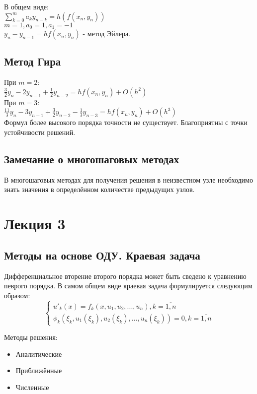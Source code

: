 В общем виде:\\
$\sum\limits_{k=0}^{m} a_{k} y_{n - k} = h(f(x_{n}, y_{n}))$\\
$m = 1, a_{0} = 1, a_{1} = -1$\\
$y_{n} - y_{n - 1} = h f (x_{n}, y_{n})$ - метод Эйлера.\\

\section{Метод Гира}
При $m = 2$:\\
$\frac{3}{2} y_{n} - 2 y_{n-1} + \frac{1}{2}y_{n-2} = h f (x_{n}, y_{n}) + O(h^{2})$\\
При $m = 3$:\\
$\frac{11}{3}y_{n} - 3y_{n-1} + \frac{3}{2}y_{n-2} - \frac{1}{3}y_{n-3} = h f(x_{n}, y_{n}) + O(h^{3})$\\

Формул более высокого порядка точности не существует. Благоприятны с точки устойчивости решений.

\section{Замечание о многошаговых методах}
В многошаговых методах для получения решения в неизвестном узле необходимо знать значения в определённом количестве предыдущих узлов.

\chapter{Лекция 3}
\section{Методы на основе ОДУ. Краевая задача}
Дифференциальное вторение второго порядка может быть сведено к уравнению певрого порядка. В самом общем виде краевая задача формулируется следующим образом:\\
\begin{equation}
\begin{cases}
u'_{k}(x) = f_{k}(x, u_{1}, u_{2}, ..., u_{n}), k = \overline{1, n}\\
\phi_{k}(\xi_{k}, u_{1}(\xi_{k}), u_{2}(\xi_{k}), ..., u_{n}(\xi_{k})) = 0, k = \overline{1, n}
\end{cases}
\end{equation}

Методы решения:
\begin{itemize}
\item Аналитические
\item Приближённые
\item Численные
\end{itemize}

